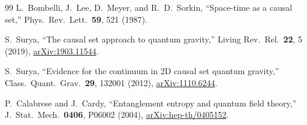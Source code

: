 \documentclass[aps,prd,twocolumn,superscriptaddress,nofootinbib]{revtex4-2}
\begin{document}
\begin{thebibliography}{99}
L.~Bombelli, J.~Lee, D.~Meyer, and R.~D.~Sorkin,
``Space-time as a causal set,''
Phys.\ Rev.\ Lett.\ \textbf{59}, 521 (1987).

S.~Surya,
``The causal set approach to quantum gravity,''
Living Rev.\ Rel.\ \textbf{22}, 5 (2019),
\href{https://arxiv.org/abs/1903.11544}{arXiv:1903.11544}.

S.~Surya,
``Evidence for the continuum in 2D causal set quantum gravity,''
Class.\ Quant.\ Grav.\ \textbf{29}, 132001 (2012),
\href{https://arxiv.org/abs/1110.6244}{arXiv:1110.6244}.

P.~Calabrese and J.~Cardy,
``Entanglement entropy and quantum field theory,''
J.\ Stat.\ Mech.\ \textbf{0406}, P06002 (2004),
\href{https://arxiv.org/abs/hep-th/0405152}{arXiv:hep-th/0405152}.

\end{thebibliography}
\end{document}
